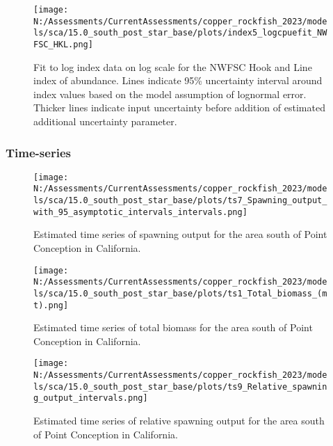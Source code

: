 \documentclass[11pt,
  english,
  letterpaper,
]{article}
\begin{document}
\pagebreak

\begin{figure}
\centering
\texttt{[image: N:/Assessments/CurrentAssessments/copper\_rockfish\_2023/models/sca/15.0\_south\_post\_star\_base/plots/index5\_logcpuefit\_NWFSC\_HKL.png]}
\caption{Fit to log index data on log scale for the NWFSC Hook and Line index of abundance. Lines indicate 95\% uncertainty interval around index values based on the model assumption of lognormal error. Thicker lines indicate input uncertainty before addition of estimated additional uncertainty parameter.\label{fig:nwfsc-hkl-index-fit}}
\end{figure}

\pagebreak

\hypertarget{time-series}{%
\subsubsection{Time-series}\label{time-series}}

\begin{figure}
\centering
\texttt{[image: N:/Assessments/CurrentAssessments/copper\_rockfish\_2023/models/sca/15.0\_south\_post\_star\_base/plots/ts7\_Spawning\_output\_with\_95\_asymptotic\_intervals\_intervals.png]}
\caption{Estimated time series of spawning output for the area south of Point Conception in California.\label{fig:ssb}}
\end{figure}

\pagebreak

\begin{figure}
\centering
\texttt{[image: N:/Assessments/CurrentAssessments/copper\_rockfish\_2023/models/sca/15.0\_south\_post\_star\_base/plots/ts1\_Total\_biomass\_(mt).png]}
\caption{Estimated time series of total biomass for the area south of Point Conception in California.\label{fig:tot-bio}}
\end{figure}

\pagebreak

\begin{figure}
\centering
\texttt{[image: N:/Assessments/CurrentAssessments/copper\_rockfish\_2023/models/sca/15.0\_south\_post\_star\_base/plots/ts9\_Relative\_spawning\_output\_intervals.png]}
\caption{Estimated time series of relative spawning output for the area south of Point Conception in California.\label{fig:depl}}
\end{figure}
\end{document}
